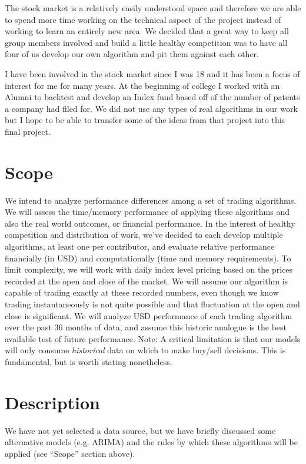 \documentclass[12pt,english]{article}
\begin{document}
The stock market is a relatively easily understood space and therefore we are able to spend more time working on the technical aspect of the project instead of working to learn an entirely new area. We decided that a great way to keep all group members involved and build a little healthy competition was to have all four of us develop our own algorithm and pit them against each other. 

I have been involved in the stock market since I was 18 and it has been a focus of interest for me for many years. At the beginning of college I worked with an Alumni to backtest and develop an Index fund based off of the number of patents a company had filed for. We did not use any types of real algorithms in our work but I hope to be able to transfer some of the ideas from that project into this final project.


\section*{Scope}
We intend to analyze performance differences among a set of trading algorithms. We will assess the time/memory performance of applying these algorithms and also the real world outcomes, or financial performance. In the interest of healthy competition and distribution of work, we’ve decided to each develop multiple algorithms, at least one per contributor, and evaluate relative performance financially (in USD) and computationally (time and memory requirements).
\newline\newline
\noindent To limit complexity, we will work with daily index level pricing based on the prices recorded at the open and close of the market. We will assume our algorithm is capable of trading exactly at these recorded numbers, even though we know trading instantaneously is not quite possible and that fluctuation at the open and close is significant. We will analyze USD performance of each trading algorithm over the past 36 months of data, and assume this historic analogue is the best available test of future performance.
\newline\newline
\noindent Note: A critical limitation is that our models will only consume \textit{historical} data on which to make buy/sell decisions. This is fundamental, but is worth stating nonetheless.

\section*{Description}
We have not yet selected a data source, but we have briefly discussed some alternative models (e.g. ARIMA) and the rules by which these algorithms will be applied (see ``Scope'' section above).

\end{document}
